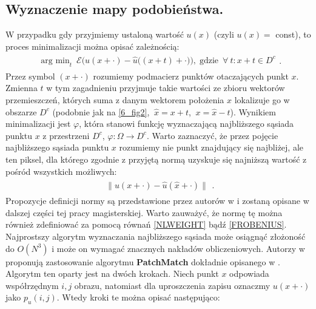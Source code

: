 \documentclass[12pt, twoside, openany]{report}
\theoremstyle{definition}
\begin{document}
\subsection{Wyznaczenie mapy podobieństwa.}
\label{ssec:wyznaczanieMapySection}
W przypadku gdy przyjmiemy ustaloną wartość $u(x)$ (czyli $u(x) = $ const), to proces minimalizacji można opisać zależnością:
\begin{align}
\begin{aligned}
\mathop{\operatorname{arg \ min}}_{t} \ \mathcal{E}\biggl( u(x+\cdot) - {\hat{u}}\bigl((x+t)+\cdot\bigr)\biggr),\operatorname{gdzie} \ \forall \ t : x+t \in D^c
\label{minNNF}
\end{aligned}
.
\end{align}
Przez symbol $(x+\cdot)$ rozumiemy podmacierz punktów otaczających punkt $x$. 
Zmienna $t$ w tym zagadnieniu przyjmuje takie wartości ze zbioru wektorów przemieszczeń, których suma z danym wektorem położenia $x$ lokalizuje go w obszarze $D^c$ (podobnie jak na \autoref{6_fig2}, $ \ \hat{x} = x + t$, $ \ x = \hat{x} - t$). Wynikiem minimalizacji jest $\varphi$, która stanowi funkcję wyznaczającą najbliższego sąsiada punktu $x$ z przestrzeni $D^c$, $\varphi :\Omega \rightarrow D^c$. Warto zaznaczyć, że przez pojęcie najbliższego sąsiada punktu $x$ rozumiemy nie punkt znajdujący się najbliżej, ale ten piksel, dla którego zgodnie z przyjętą normą uzyskuje się najniższą wartość z pośród wszystkich możliwych:
\begin{align}
\begin{aligned}
\big\| u(x + \cdot) - \hat{u}(\hat{x}+\cdot) \big\| 
\label{normNNF}
\end{aligned}
.
\end{align}
Propozycje definicji normy są przedstawione przez autorów w \cite{MathematicalModelsforNLTextureInpainting} i zostaną opisane w dalszej części tej pracy magisterskiej. Warto zauważyć, że normę tę można również zdefiniować za pomocą równań \eqref{NLWEIGHT} bądź \eqref{FROBENIUS}. Najprostszy algorytm wyznaczania najbliższego sąsiada może osiągnąć złożoność do $O(N^3)$ i może on wymagać znacznych nakładów obliczeniowych. Autorzy w \cite{arias2011variational} proponują zastosowanie algorytmu \textbf{PatchMatch} dokładnie opisanego w \cite{barnes2009patchmatch}. Algorytm ten oparty jest na dwóch krokach. Niech punkt $x$ odpowiada współrzędnym $i, j$ obrazu, natomiast dla uproszczenia zapisu oznaczmy $u(x+\cdot)$ jako $p_u(i,j)$. Wtedy kroki te można opisać następująco:
\end{document}
